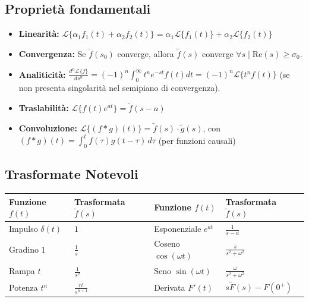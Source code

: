 \subsection*{Proprietà fondamentali}
\begin{itemize}
    \item \textbf{Linearità:} $\mathcal{L}\{\alpha_1 f_1(t) + \alpha_2 f_2(t)\} = \alpha_1 \mathcal{L}\{f_1(t)\} + \alpha_2 \mathcal{L}\{f_2(t)\}$
    \item \textbf{Convergenza:} Se $\tilde{f}(s_0)$ converge, allora $\tilde{f}(s)$ converge $\forall s \mid \text{Re}(s) \ge \sigma_0$.
    \item \textbf{Analiticità:} $\frac{d^n \mathcal{L}\{f\}}{ds^n} = (-1)^n \int_0^\infty t^n e^{-st} f(t) dt = (-1)^n \mathcal{L}\{t^n f(t)\}$ (se non presenta singolarità nel semipiano di convergenza).
    \item \textbf{Traslabilità:} $\mathcal{L}\{f(t) e^{at}\} = \tilde{f}(s-a)$
    \item \textbf{Convoluzione:} $\mathcal{L}\{(f * g)(t)\} = \tilde{f}(s) \cdot \tilde{g}(s)$, con $(f * g)(t) = \int_0^t f(\tau)g(t-\tau)\,d\tau$ (per funzioni causali)
\end{itemize}

\subsection*{Trasformate Notevoli}
\begin{center}
\renewcommand{\arraystretch}{1.5}
\begin{tabular}{ll | ll}
\toprule
\textbf{Funzione $f(t)$} & \textbf{Trasformata $\tilde{f}(s)$} & \textbf{Funzione $f(t)$} & \textbf{Trasformata $\tilde{f}(s)$} \\
\midrule
Impulso $\delta(t)$ & $1$ & Esponenziale $e^{at}$ & $\frac{1}{s-a}$ \\
Gradino $1$ & $\frac{1}{s}$ & Coseno $\cos(\omega t)$ & $\frac{s}{s^2+\omega^2}$ \\
Rampa $t$ & $\frac{1}{s^2}$ & Seno $\sin(\omega t)$ & $\frac{\omega}{s^2+\omega^2}$ \\
Potenza $t^n$ & $\frac{n!}{s^{n+1}}$ & Derivata $F'(t)$ & $s\tilde{F}(s) - F(0^+)$ \\
\bottomrule
\end{tabular}
\end{center}

